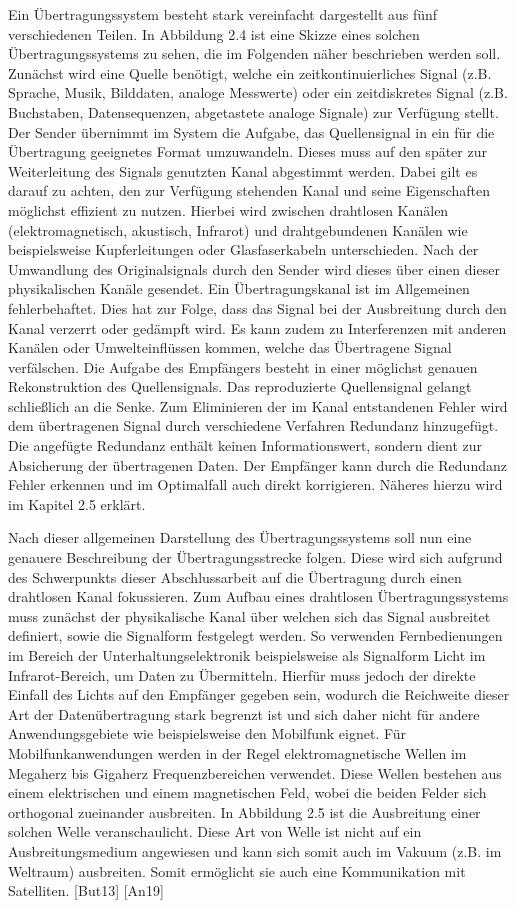 Ein Übertragungssystem besteht stark vereinfacht dargestellt aus fünf verschiedenen Teilen. In Abbildung 2.4 ist eine Skizze eines solchen Übertragungssystems zu sehen, die im Folgenden näher beschrieben werden soll. Zunächst wird eine Quelle benötigt, welche ein zeitkontinuierliches Signal (z.B. Sprache, Musik, Bilddaten, analoge Messwerte) oder ein zeitdiskretes Signal (z.B. Buchstaben, Datensequenzen, abgetastete analoge Signale) zur Verfügung stellt. Der Sender übernimmt im System die Aufgabe, das Quellensignal in ein für die Übertragung geeignetes Format umzuwandeln. Dieses muss auf den später zur Weiterleitung des Signals genutzten Kanal abgestimmt werden. Dabei gilt es darauf zu achten, den zur Verfügung stehenden Kanal und seine Eigenschaften möglichst effizient zu nutzen. Hierbei
wird zwischen drahtlosen Kanälen (elektromagnetisch, akustisch, Infrarot) und drahtgebundenen Kanälen wie beispielsweise Kupferleitungen oder Glasfaserkabeln unterschieden.
Nach der Umwandlung des Originalsignals durch den Sender wird dieses über einen dieser physikalischen Kanäle gesendet. Ein Übertragungskanal ist im Allgemeinen fehlerbehaftet. Dies hat zur Folge, dass das Signal bei der Ausbreitung durch den Kanal verzerrt oder gedämpft wird. Es kann zudem zu Interferenzen mit anderen Kanälen oder Umwelteinflüssen kommen, welche das Übertragene Signal verfälschen.
Die Aufgabe des Empfängers besteht in einer möglichst genauen Rekonstruktion des Quellensignals. Das reproduzierte Quellensignal gelangt schließlich an die Senke. Zum Eliminieren der im Kanal entstandenen Fehler wird dem übertragenen Signal durch verschiedene Verfahren Redundanz hinzugefügt. Die angefügte Redundanz enthält keinen Informationswert, sondern dient zur Absicherung der übertragenen Daten. Der Empfänger kann durch die Redundanz Fehler erkennen und im Optimalfall auch direkt korrigieren. Näheres hierzu wird im Kapitel 2.5 erklärt.

Nach dieser allgemeinen Darstellung des Übertragungssystems soll nun eine genauere Beschreibung der Übertragungsstrecke folgen. Diese wird sich aufgrund des Schwerpunkts dieser Abschlussarbeit auf die Übertragung durch einen drahtlosen Kanal fokussieren. Zum Aufbau eines drahtlosen Übertragungssystems muss zunächst der physikalische Kanal über welchen sich das Signal ausbreitet definiert, sowie die Signalform festgelegt werden. So verwenden Fernbedienungen im Bereich der Unterhaltungselektronik beispielsweise als Signalform Licht im Infrarot-Bereich, um Daten zu Übermitteln. Hierfür muss jedoch der direkte Einfall des Lichts auf den Empfänger gegeben sein, wodurch die Reichweite dieser Art der
Datenübertragung stark begrenzt ist und sich daher nicht für andere Anwendungsgebiete wie beispielsweise den Mobilfunk eignet. Für Mobilfunkanwendungen werden in der Regel elektromagnetische Wellen im Megaherz bis Gigaherz Frequenzbereichen verwendet. Diese Wellen bestehen aus einem elektrischen und einem magnetischen Feld, wobei die beiden Felder sich orthogonal zueinander ausbreiten.
In Abbildung 2.5 ist die Ausbreitung einer solchen Welle veranschaulicht. Diese Art von
Welle ist nicht auf ein Ausbreitungsmedium angewiesen und kann sich somit auch im
Vakuum (z.B. im Weltraum) ausbreiten. Somit ermöglicht sie auch eine Kommunikation
mit Satelliten. [But13] [An19]


